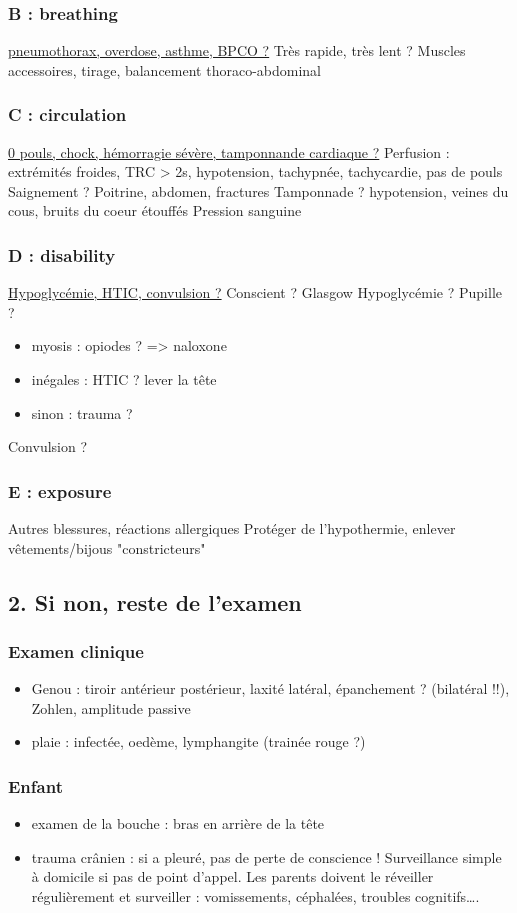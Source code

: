 \documentclass[11pt]{article}
\begin{document}
\subsubsection{B : breathing}
\label{sec:org495672d}
\uline{pneumothorax, overdose, asthme, BPCO ?}
Très rapide, très lent ?
Muscles accessoires, tirage, balancement thoraco-abdominal
\subsubsection{C : circulation}
\label{sec:orgb110504}
\uline{0 pouls, chock, hémorragie sévère, tamponnande cardiaque ?}
Perfusion : extrémités froides, TRC > 2s, hypotension, tachypnée, tachycardie,
pas de pouls
Saignement ? Poitrine, abdomen, fractures
Tamponnade ? hypotension, veines du cous, bruits du coeur étouffés
Pression sanguine
\subsubsection{D : disability}
\label{sec:orgaa5be4b}
\uline{Hypoglycémie, HTIC, convulsion ?}
Conscient ? Glasgow
Hypoglycémie ?
Pupille ?
\begin{itemize}
\item myosis :  opiodes ? => naloxone
\item inégales : HTIC ? lever la tête
\item sinon : trauma ?
\end{itemize}
Convulsion ?
\subsubsection{E : exposure}
\label{sec:org43d7adb}
Autres blessures, réactions allergiques
Protéger de l'hypothermie, enlever vêtements/bijous "constricteurs"

\subsection{2. Si non, reste de l'examen}
\label{sec:org6c179a5}
\subsubsection{Examen clinique}
\label{sec:orgcf647d2}
\begin{itemize}
\item Genou : tiroir antérieur postérieur, laxité latéral, épanchement ? (bilatéral !!), Zohlen, amplitude passive
\item plaie : infectée, oedème, lymphangite (trainée rouge ?)
\end{itemize}
\subsubsection{Enfant}
\label{sec:org4a07d9a}
\begin{itemize}
\item examen de la bouche : bras en arrière de la tête
\item trauma crânien : si a pleuré, pas de perte de conscience !
Surveillance simple à domicile si pas de point d'appel. Les parents
doivent le réveiller régulièrement et surveiller : vomissements,
céphalées, troubles cognitifs\ldots{}.
\end{itemize}
\end{document}
